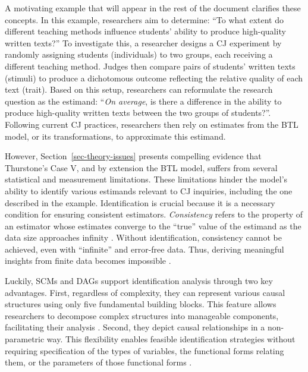 \documentclass[
  authoryear,
  review,
  1p]{elsarticle}
\begin{document}
A motivating example that will appear in the rest of the document
clarifies these concepts. In this example, researchers aim to determine:
``To what extent do different teaching methods influence students'
ability to produce high-quality written texts?'' To investigate this, a
researcher designs a CJ experiment by randomly assigning students
(individuals) to two groups, each receiving a different teaching method.
Judges then compare pairs of students' written texts (stimuli) to
produce a dichotomous outcome reflecting the relative quality of each
text (trait). Based on this setup, researchers can reformulate the
research question as the estimand: ``\emph{On average}, is there a
difference in the ability to produce high-quality written texts between
the two groups of students?''. Following current CJ practices,
researchers then rely on estimates from the BTL model, or its
transformations, to approximate this estimand.

However, Section~\ref{sec-theory-issues} presents compelling evidence
that Thurstone's Case V, and by extension the BTL model, suffers from
several statistical and measurement limitations. These limitations
hinder the model's ability to identify various estimands relevant to CJ
inquiries, including the one described in the example. Identification is
crucial because it is a necessary condition for ensuring consistent
estimators. \emph{Consistency} refers to the property of an estimator
whose estimates converge to the ``true'' value of the estimand as the
data size approaches infinity \citep{Everitt_et_al_2010}. Without
identification, consistency cannot be achieved, even with ``infinite''
and error-free data. Thus, deriving meaningful insights from finite data
becomes impossible \citep[pp.~5]{Schuessler_et_al_2023}.

Luckily, SCMs and DAGs support identification analysis through two key
advantages. First, regardless of complexity, they can represent various
causal structures using only five fundamental building blocks. This
feature allows researchers to decompose complex structures into
manageable components, facilitating their analysis
\citep{Neal_2020, McElreath_2020}. Second, they depict causal
relationships in a non-parametric way. This flexibility enables feasible
identification strategies without requiring specification of the types
of variables, the functional forms relating them, or the parameters of
those functional forms \citep[pp.~35]{Pearl_et_al_2016}.
\end{document}
